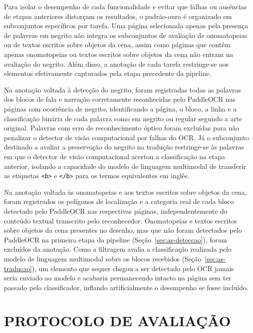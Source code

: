 \documentclass[
    12pt,
    openright,
    oneside,
    a4paper,
    chapter=TITLE,
    section=TITLE,
    english,
    brazilian,
    brazil
]{abntex2}
\begin{document}
Para isolar o desempenho de cada funcionalidade e evitar que falhas ou ausências de etapas anteriores distorçam os resultados, o padrão-ouro é organizado em subconjuntos específicos por tarefa. Uma página selecionada apenas pela presença de palavras em negrito não integra os subconjuntos de avaliação de onomatopeias ou de textos escritos sobre objetos da cena, assim como páginas que contêm apenas onomatopeias ou textos escritos sobre objetos da cena não entram na avaliação do negrito. Além disso, a anotação de cada tarefa restringe-se aos elementos efetivamente capturados pela etapa precedente da pipeline.

Na anotação voltada à detecção do negrito, foram registradas todas as palavras dos blocos de fala e narração corretamente reconhecidas pelo PaddleOCR nas páginas com ocorrência de negrito, identificando a página, o bloco, a linha e a classificação binária de cada palavra como em negrito ou regular segundo a arte original. Palavras com erro de reconhecimento óptico foram excluídas para não penalizar o detector de visão computacional por falhas do OCR. Já o subconjunto destinado a avaliar a preservação do negrito na tradução restringe-se às palavras em que o detector de visão computacional acertou a classificação na etapa anterior, isolando a capacidade do modelo de linguagem multimodal de transferir as etiquetas \texttt{<b>} e \texttt{</b>} para os termos equivalentes em inglês.

Na anotação voltada às onomatopeias e aos textos escritos sobre objetos da cena, foram registrados os polígonos de localização e a categoria real de cada bloco detectado pelo PaddleOCR nas respectivas páginas, independentemente do conteúdo textual transcrito pelo reconhecedor. Onomatopeias e textos escritos sobre objetos da cena presentes no desenho, mas que não foram detectados pelo PaddleOCR na primeira etapa da pipeline (Seção~\ref{sec:as-deteccao}), foram excluídos da anotação. Como a filtragem avalia a classificação realizada pelo modelo de linguagem multimodal sobre os blocos recebidos (Seção~\ref{sec:as-traducao}), um elemento que sequer chegou a ser detectado pelo OCR jamais seria enviado ao modelo e acabaria permanecendo intacto na página sem ter passado pelo classificador, inflando artificialmente o desempenho se fosse incluído.

\section{PROTOCOLO DE AVALIAÇÃO}
\label{sec:protocolo-avaliacao}
\end{document}
